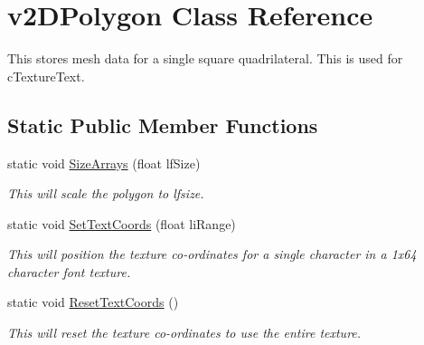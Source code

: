 \hypertarget{classv2_d_polygon}{
\section{v2DPolygon Class Reference}
\label{classv2_d_polygon}
}


This stores mesh data for a single square quadrilateral. This is used for cTextureText.  


\subsection*{Static Public Member Functions}
\begin{DoxyCompactItemize}
\item 
static void \hyperlink{classv2_d_polygon_aa77877ada2df78c8715a37ee69e7970f}{SizeArrays} (float lfSize)
\begin{DoxyCompactList}\small\item\em This will scale the polygon to lfsize. \item\end{DoxyCompactList}\item 
static void \hyperlink{classv2_d_polygon_a52a4fc6f6e6d3a59387f8cfe5e64ed1e}{SetTextCoords} (float liRange)
\begin{DoxyCompactList}\small\item\em This will position the texture co-\/ordinates for a single character in a 1x64 character font texture. \item\end{DoxyCompactList}\item 
static void \hyperlink{classv2_d_polygon_a43323ef65b79a1321d290cfea22b8393}{ResetTextCoords} ()
\begin{DoxyCompactList}\small\item\em This will reset the texture co-\/ordinates to use the entire texture. \item\end{DoxyCompactList}\end{DoxyCompactItemize}
